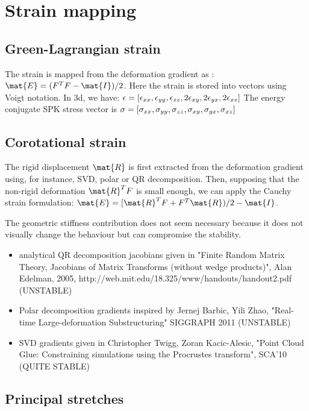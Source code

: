 \section{Strain mapping} \label{sec strain mapping}

\subsection{Green-Lagrangian strain}

The strain is mapped from the deformation gradient as : $\mat{E} = (\defograd^T\defograd - \mat{I} )/2$.
Here the strain is stored into vectors using Voigt notation. In 3d, we have: $\epsilon = [\epsilon_{xx} , \epsilon_{yy} , \epsilon_{zz} , 2\epsilon_{xy} , 2\epsilon_{yx} , 2\epsilon_{xz} ] $
The energy conjugate SPK stress vector is $\sigma = [\sigma_{xx} , \sigma_{yy} , \sigma_{zz} , \sigma_{xy} , \sigma_{yx} , \sigma_{xz} ] $

\subsection{Corotational strain}

The rigid displacement $\mat{R}$ is first extracted from the deformation gradient using, for instance, SVD, polar or QR decomposition.
Then, supposing that the non-rigid deformation $\mat{R}^T \defograd$ is small enough, we can apply the Cauchy strain formulation:  $\mat{E} = [\mat{R}^T \defograd + \defograd^T \mat{R} ) /2 - \mat{I} $.


The geometric stiffness contribution does not seem necessary because it does not visually change the behaviour but can compromise the stability.
\begin{itemize}
\item analytical QR decomposition jacobians given in "Finite Random Matrix Theory, Jacobians of Matrix Transforms (without wedge products)", Alan Edelman, 2005, http://web.mit.edu/18.325/www/handouts/handout2.pdf (UNSTABLE)
\item Polar decomposition gradients inspired by Jernej Barbic, Yili Zhao, "Real-time Large-deformation Substructuring" SIGGRAPH 2011 (UNSTABLE)
\item SVD gradients given in Christopher Twigg, Zoran Kacic-Alesic, "Point Cloud Glue: Constraining simulations using the Procrustes transform", SCA'10 (QUITE STABLE)
\end{itemize}

\subsection{Principal stretches}

